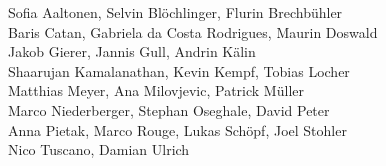 %
%
%
Sofia Aaltonen,		%
Selvin Blöchlinger,	%
Flurin Brechbühler%
\\
Baris Catan,		%
Gabriela da Costa Rodrigues,	%
Maurin Doswald%
\\
Jakob Gierer,		%
Jannis Gull,		%
Andrin Kälin%
\\
Shaarujan Kamalanathan,	%
Kevin Kempf,		%
Tobias Locher%
\\
Matthias Meyer,		%
Ana Milovjevic,		%
Patrick Müller%
\\
Marco Niederberger,	%
Stephan Oseghale,	%
David Peter%
\\
Anna Pietak,		%
Marco Rouge,		%
Lukas Schöpf,		%
Joel Stohler%
\\
Nico Tuscano,		%
Damian Ulrich%
